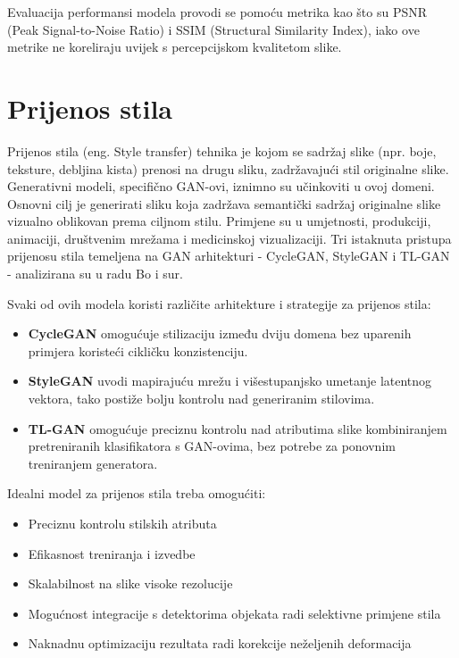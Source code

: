 \documentclass[times, utf8, seminar, numeric]{fer}
\begin{document}
		Evaluacija performansi modela provodi se pomoću metrika kao što su PSNR (Peak Signal-to-Noise Ratio) i SSIM (Structural Similarity Index), iako ove metrike ne koreliraju uvijek s percepcijskom kvalitetom slike.
		
		\section{Prijenos stila}
		Prijenos stila (eng. Style transfer) tehnika je kojom se sadržaj slike (npr. boje, teksture, debljina kista) prenosi na drugu sliku, zadržavajući stil originalne slike. Generativni modeli, specifično GAN-ovi, iznimno su učinkoviti u ovoj domeni. Osnovni cilj je generirati sliku koja zadržava semantički sadržaj originalne slike vizualno oblikovan prema ciljnom stilu. Primjene su u umjetnosti, produkciji, animaciji, društvenim mrežama i medicinskoj vizualizaciji.
		Tri istaknuta pristupa prijenosu stila temeljena na GAN arhitekturi - CycleGAN, StyleGAN i TL-GAN - analizirana su u radu Bo i sur. \cite{bo2021style}
		
		Svaki od ovih modela koristi različite arhitekture i strategije za prijenos stila:
		\begin{itemize}
			\item \textbf{CycleGAN} omogućuje stilizaciju između dviju domena bez uparenih primjera koristeći cikličku konzistenciju.
			\item \textbf{StyleGAN} uvodi mapirajuću mrežu i višestupanjsko umetanje latentnog vektora, tako postiže bolju kontrolu nad generiranim stilovima.
			\item \textbf{TL-GAN} omogućuje preciznu kontrolu nad atributima slike kombiniranjem pretreniranih klasifikatora s GAN-ovima, bez potrebe za ponovnim treniranjem generatora.
		\end{itemize}
		
		Idealni model za prijenos stila treba omogućiti:
		\begin{itemize}
			\item Preciznu kontrolu stilskih atributa
			\item Efikasnost treniranja i izvedbe
			\item Skalabilnost na slike visoke rezolucije
			\item Mogućnost integracije s detektorima objekata radi selektivne primjene stila
			\item Naknadnu optimizaciju rezultata radi korekcije neželjenih deformacija
		\end{itemize}
		
\end{document}
